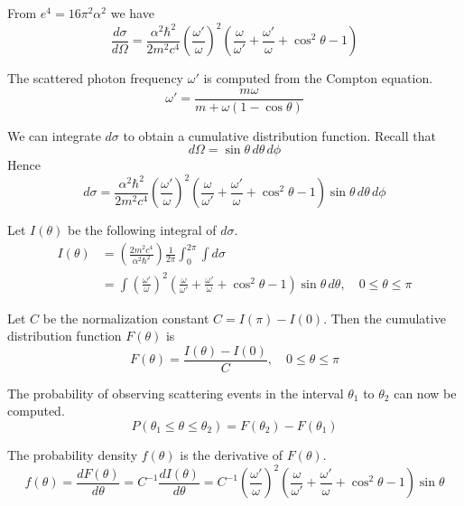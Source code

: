 \documentclass[12pt]{article}
\begin{document}
\noindent
From $e^4=16\pi^2\alpha^2$ we have
\begin{equation*}
\frac{d\sigma}{d\Omega}
=\frac{\alpha^2\hbar^2}{2m^2c^4}
\left(\frac{\omega'}{\omega}\right)^2
\left(
\frac{\omega}{\omega'}+\frac{\omega'}{\omega}+\cos^2\theta-1
\right)
\end{equation*}

\noindent
The scattered photon frequency $\omega'$ is computed from the Compton equation.
\begin{equation*}
\omega'=\frac{m\omega}{m+\omega(1-\cos\theta)}
\end{equation*}

\noindent
We can integrate $d\sigma$ to obtain a cumulative distribution function.
Recall that
\begin{equation*}
d\Omega=\sin\theta\,d\theta\,d\phi
\end{equation*}
Hence
\begin{equation*}
d\sigma
=\frac{\alpha^2\hbar^2}{2m^2c^4}
\left(\frac{\omega'}{\omega}\right)^2
\left(\frac{\omega}{\omega'}+\frac{\omega'}{\omega}+\cos^2\theta-1\right)
\sin\theta\,d\theta\,d\phi
\end{equation*}

\bigskip
\noindent
Let $I(\theta)$ be the following integral of $d\sigma$.
\begin{align*}
I(\theta)
&=\left(\frac{2m^2c^4}{\alpha^2\hbar^2}\right)\frac{1}{2\pi}\int_0^{2\pi}\int d\sigma
\\
&=\int
\left(\frac{\omega'}{\omega}\right)^2
\left(\frac{\omega}{\omega'}+\frac{\omega'}{\omega}+\cos^2\theta-1\right)
\sin\theta\,d\theta,
\quad0\le\theta\le\pi
\end{align*}

\noindent
Let $C$ be the normalization constant $C=I(\pi)-I(0)$.
Then the cumulative distribution function $F(\theta)$ is
\begin{equation*}
F(\theta)=\frac{I(\theta)-I(0)}{C},
\quad0\le\theta\le\pi
\end{equation*}

\noindent
The probability of observing scattering events in the interval
$\theta_1$ to $\theta_2$ can now be computed.
\begin{equation*}
P(\theta_1\le\theta\le\theta_2)=F(\theta_2)-F(\theta_1)
\end{equation*}

\noindent
The probability density $f(\theta)$ is the derivative of $F(\theta)$.
\begin{equation*}
f(\theta)=\frac{dF(\theta)}{d\theta}=C^{-1}\frac{dI(\theta)}{d\theta}
=C^{-1}
\left(\frac{\omega'}{\omega}\right)^2
\left(\frac{\omega}{\omega'}+\frac{\omega'}{\omega}+\cos^2\theta-1\right)
\sin\theta
\end{equation*}
\end{document}
